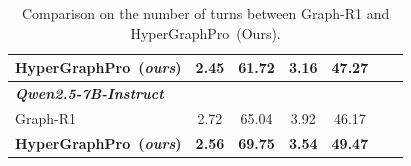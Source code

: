\begin{table}[t]
\begin{minipage}[t!]{0.50\textwidth}
\begin{center}
{\begin{tabular}{lcccccc}
         \rowcolor{HyperGraphPro!15}
         \textbf{HyperGraphPro~(\textit{ours})} &\textbf{2.45} &\textbf{61.72} & \textbf{3.16} &\textbf{47.27} \\
         \midrule
         \textbf{\textit{Qwen2.5-7B-Instruct}}\\
                  Graph-R1  & 2.72 & 65.04  &  3.92 & 46.17 \\
         \rowcolor{HyperGraphPro!15}
         \textbf{HyperGraphPro~(\textit{ours})} &\textbf{2.56} &\textbf{69.75} & \textbf{3.54} &\textbf{49.47} \\
        \bottomrule
    \end{tabular}
    }
    \vspace{-10pt}
    \end{center}
    \caption{Comparison on the number of turns between Graph-R1 and HyperGraphPro~(Ours).
    }
    \label{tab:eff}
    \vspace{-10pt}
\end{minipage}
\end{table}
